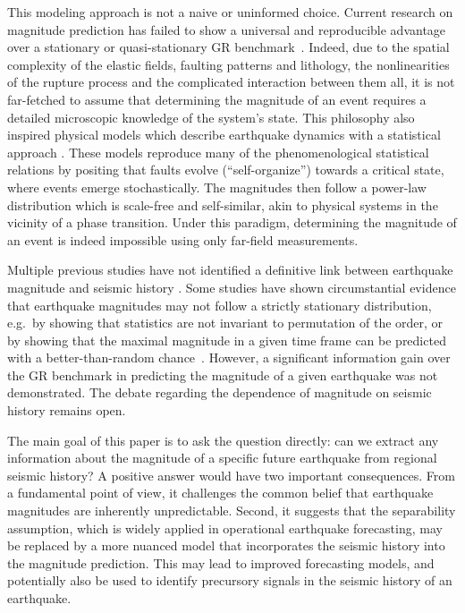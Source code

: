\documentclass[pdflatex]{sn-jnl}
\begin{document}
This modeling approach is not a naive or uninformed choice.  Current research on magnitude prediction has failed to show a universal and reproducible advantage over a stationary or quasi-stationary GR benchmark~\cite{ogata_exploring_2018, stockman_forecasting_2023}. Indeed, due to the spatial complexity of the elastic fields, faulting patterns and lithology, the nonlinearities of the rupture process and the complicated interaction between them all, it is not far-fetched to assume that determining the magnitude of an event requires a detailed microscopic knowledge of the system's state. 
This philosophy also inspired physical models which describe earthquake dynamics with a statistical approach \cite{olami_self-organized_1992, sornette_self-organized_1989, bak_earthquakes_1989, de_geus_scaling_2022}. These models reproduce many of the phenomenological statistical relations by positing that faults evolve (``self-organize'') towards a critical state, where events emerge stochastically. The magnitudes then follow a power-law distribution which is scale-free and self-similar, akin to physical systems in the vicinity of a phase transition. Under this paradigm, determining the magnitude of an event is indeed impossible using only far-field measurements. 

Multiple previous studies have not identified a definitive link between earthquake magnitude and seismic history \cite{petrillo_verifying_2023, taroni_are_2024, davidsen_are_2011}. Some studies have shown circumstantial evidence that earthquake magnitudes may not follow a strictly stationary distribution, e.g.~by showing that statistics are not invariant to permutation of the order, or by showing that the maximal magnitude in a given time frame can be predicted with a better-than-random chance~\cite{xiong_seismic_2023, corral_comment_2005, spassiani_exploring_2016, lippiello_positive_2024, lippiello_positive_2024-1, lippiello_influence_2008, shcherbakov_forecasting_2019, panakkat_neural_2007}. However, a significant information gain over the GR benchmark in predicting the magnitude of a given earthquake was not demonstrated. The debate regarding the dependence of magnitude on seismic history remains open.

The main goal of this paper is to ask the question directly: can we extract any information about the magnitude of a specific future earthquake from regional seismic history? A positive answer would have two important consequences. From a fundamental point of view, it challenges the common belief that earthquake magnitudes are inherently unpredictable. Second, it suggests that the separability assumption, which is widely applied in operational earthquake forecasting, may be replaced by a more nuanced model that incorporates the seismic history into the magnitude prediction. This may lead to improved forecasting models, and potentially also be used to identify precursory signals in the seismic history of an earthquake.
\end{document}
